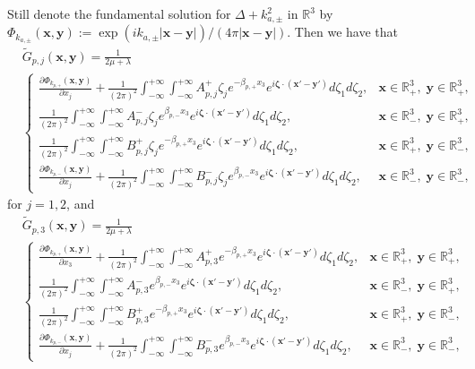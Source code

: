 \documentclass[final,reqno]{siamltex}
\newcommand{\pa}{\partial}
\newcommand{\wid}{\widetilde}
\newcommand{\mat}{\mathbb}
\newcommand{\R}{{\mat R}}
\begin{document}
Still denote the fundamental solution for $\Delta+k_{a,\pm}^2$ in $\R^3$ by $\Phi_{k_{a,\pm}}(\mathbf{x},\mathbf{y}):=\exp(ik_{a,\pm}|\mathbf{x}-\mathbf{y}|)/(4\pi|\mathbf{x}-\mathbf{y}|)$. Then we have that 
\begin{align*}
&\wid G_{p,j}(\mathbf{x},\mathbf{y})=\frac{1}{2\mu+\lambda} \\
&\left\{
\begin{array}{ll}
	\displaystyle\frac{\pa\Phi_{k_{p,+}}(\mathbf{x},\mathbf{y})}{\pa x_j}+\frac{1}{(2\pi)^2}\int_{-\infty}^{+\infty}\int_{-\infty}^{+\infty}A_{p,j}^+\zeta_je^{-\beta_{p,+}x_3}e^{i\boldsymbol{\zeta}\cdot(\mathbf{x}'-\mathbf{y}')}d\zeta_1d\zeta_2,&\mathbf{x}\in\R^3_+,\;\mathbf{y}\in\R^3_+,\\
	\displaystyle\frac{1}{(2\pi)^2}\int_{-\infty}^{+\infty}\int_{-\infty}^{+\infty}A_{p,j}^-\zeta_je^{\beta_{p,-}x_3}e^{i\boldsymbol{\zeta}\cdot(\mathbf{x}'-\mathbf{y}')}d\zeta_1d\zeta_2,&\mathbf{x}\in\R^3_-,\;\mathbf{y}\in\R^3_+, \\
	\displaystyle\frac{1}{(2\pi)^2}\int_{-\infty}^{+\infty}\int_{-\infty}^{+\infty}B_{p,j}^+\zeta_je^{-\beta_{p,+}x_3}e^{i\boldsymbol{\zeta}\cdot(\mathbf{x}'-\mathbf{y}')}d\zeta_1d\zeta_2,&\mathbf{x}\in\R^3_+,\;\mathbf{y}\in\R^3_-, \\
	\displaystyle\frac{\pa\Phi_{k_{p,-}}(\mathbf{x},\mathbf{y})}{\pa x_j}+\frac{1}{(2\pi)^2}\int_{-\infty}^{+\infty}\int_{-\infty}^{+\infty}B_{p,j}^-\zeta_je^{\beta_{p,-}x_3}e^{i\boldsymbol{\zeta}\cdot(\mathbf{x}'-\mathbf{y}')}d\zeta_1d\zeta_2,&\mathbf{x}\in\R^3_-,\;\mathbf{y}\in\R^3_-, 
\end{array}
\right.
\end{align*}
for $j=1,2$, and 
\begin{align*}
&\wid G_{p,3}(\mathbf{x},\mathbf{y})=\frac{1}{2\mu+\lambda} \\
&\left\{
\begin{array}{ll}
	\displaystyle\frac{\pa\Phi_{k_{p,+}}(\mathbf{x},\mathbf{y})}{\pa x_3}+\frac{1}{(2\pi)^2}\int_{-\infty}^{+\infty}\int_{-\infty}^{+\infty}A_{p,3}^+e^{-\beta_{p,+}x_3}e^{i\boldsymbol{\zeta}\cdot(\mathbf{x}'-\mathbf{y}')}d\zeta_1d\zeta_2,&\mathbf{x}\in\R^3_+,\;\mathbf{y}\in\R^3_+,\\
	\displaystyle\frac{1}{(2\pi)^2}\int_{-\infty}^{+\infty}\int_{-\infty}^{+\infty}A_{p,3}^-e^{\beta_{p,-}x_3}e^{i\boldsymbol{\zeta}\cdot(\mathbf{x}'-\mathbf{y}')}d\zeta_1d\zeta_2,&\mathbf{x}\in\R^3_-,\;\mathbf{y}\in\R^3_+, \\
	\displaystyle\frac{1}{(2\pi)^2}\int_{-\infty}^{+\infty}\int_{-\infty}^{+\infty}B_{p,3}^+e^{-\beta_{p,+}x_3}e^{i\boldsymbol{\zeta}\cdot(\mathbf{x}'-\mathbf{y}')}d\zeta_1d\zeta_2,&\mathbf{x}\in\R^3_+,\;\mathbf{y}\in\R^3_-, \\
	\displaystyle\frac{\pa\Phi_{k_{p,-}}(\mathbf{x},\mathbf{y})}{\pa x_j}+\frac{1}{(2\pi)^2}\int_{-\infty}^{+\infty}\int_{-\infty}^{+\infty}B_{p,3}^-e^{\beta_{p,-}x_3}e^{i\boldsymbol{\zeta}\cdot(\mathbf{x}'-\mathbf{y}')}d\zeta_1d\zeta_2,&\mathbf{x}\in\R^3_-,\;\mathbf{y}\in\R^3_-, 
\end{array}
\right.
\end{align*}
\end{document}
